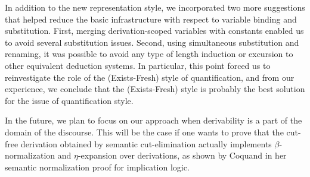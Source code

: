 \documentclass{svjour3}                     %
\newcommand{\be}{\beta}
\begin{document}
In addition to the new representation style, we incorporated two more suggestions that helped reduce the basic infrastructure with respect to variable binding and substitution. First, merging derivation-scoped variables with constants enabled us to avoid several substitution issues. Second, using simultaneous substitution and renaming, it was possible to avoid any type of length induction or excursion to other equivalent deduction systems. In particular, this point forced us to reinvestigate the role of the (Exists-Fresh) style of quantification, and from our experience, we conclude that the (Exists-Fresh) style is probably the best solution for the issue of quantification style. 

In the future, we plan to focus on our approach when derivability is a part of the domain of the discourse. This will be the case if one wants to prove that the cut-free derivation obtained by semantic cut-elimination actually implements $\be$-normalization and $\eta$-expansion over derivations, as shown by Coquand \cite{cCoquand93,cCoquand02} in her semantic normalization proof for implication logic.









\end{document}
